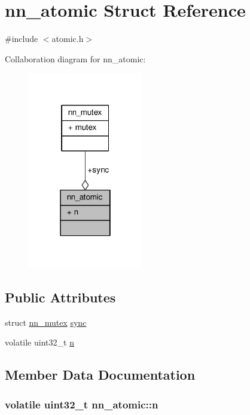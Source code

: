 \hypertarget{structnn__atomic}{}\section{nn\+\_\+atomic Struct Reference}
\label{structnn__atomic}


{\ttfamily \#include $<$atomic.\+h$>$}



Collaboration diagram for nn\+\_\+atomic\+:\nopagebreak
\begin{figure}[H]
\begin{center}
\leavevmode
\includegraphics[width=142pt]{structnn__atomic__coll__graph}
\end{center}
\end{figure}
\subsection*{Public Attributes}
\begin{DoxyCompactItemize}
\item 
struct \hyperlink{structnn__mutex}{nn\+\_\+mutex} \hyperlink{structnn__atomic_a9ca93c0867fdfbbe8414d7417be4cad2}{sync}
\item 
volatile uint32\+\_\+t \hyperlink{structnn__atomic_ab9b3e24986e552a50cc16c2ea4c5c4d7}{n}
\end{DoxyCompactItemize}


\subsection{Member Data Documentation}
\subsubsection[{n}]{\setlength{\rightskip}{0pt plus 5cm}volatile uint32\+\_\+t nn\+\_\+atomic\+::n}\hypertarget{structnn__atomic_ab9b3e24986e552a50cc16c2ea4c5c4d7}{}\label{structnn__atomic_ab9b3e24986e552a50cc16c2ea4c5c4d7}
